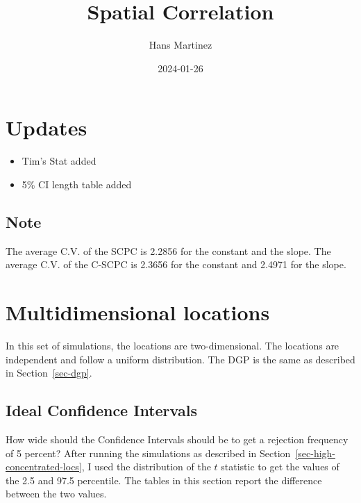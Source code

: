 \documentclass[
]{article}
\title{Spatial Correlation}
\author{Hans Martinez}
\date{2024-01-26}
\providecommand{\tightlist}{%
  \setlength{\itemsep}{0pt}\setlength{\parskip}{0pt}}\usepackage{longtable,booktabs,array}
\begin{document}
\maketitle
\ifdefined\Shaded\renewenvironment{Shaded}{\begin{tcolorbox}[frame hidden, interior hidden, sharp corners, enhanced, borderline west={3pt}{0pt}{shadecolor}, breakable, boxrule=0pt]}{\end{tcolorbox}}\fi

\hypertarget{updates}{%
\section*{Updates}\label{updates}}

\begin{itemize}
\tightlist
\item
  Tim's Stat added
\item
  5\% CI length table added
\end{itemize}

\hypertarget{note}{%
\subsection*{Note}\label{note}}

The average C.V. of the SCPC is 2.2856 for the constant and the slope.
The average C.V. of the C-SCPC is 2.3656 for the constant and 2.4971 for
the slope.

\hypertarget{sec-multi}{%
\section{Multidimensional locations}\label{sec-multi}}

In this set of simulations, the locations are two-dimensional. The
locations are independent and follow a uniform distribution. The DGP is
the same as described in Section~\ref{sec-dgp}.

\hypertarget{ideal-confidence-intervals}{%
\subsection{Ideal Confidence
Intervals}\label{ideal-confidence-intervals}}

How wide should the Confidence Intervals should be to get a rejection
frequency of 5 percent? After running the simulations as described in
Section~\ref{sec-high-concentrated-locs}, I used the distribution of the
\(t\) statistic to get the values of the 2.5 and 97.5 percentile. The
tables in this section report the difference between the two values.
\end{document}
